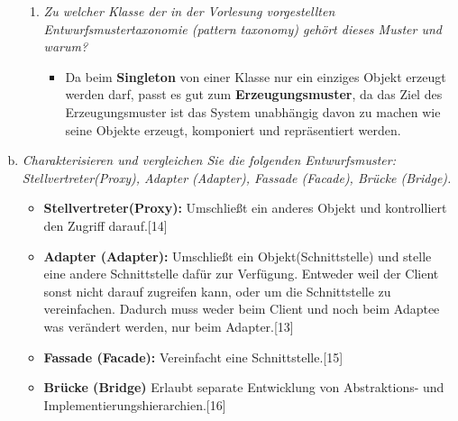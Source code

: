 \begin{enumerate}[(a)]
\begin{enumerate}[1.]
        
        \item {\itshape Zu welcher Klasse der in der Vorlesung vorgestellten Entwurfsmustertaxonomie (pattern taxonomy) gehört dieses Muster und warum?}
        \begin{itemize} 
            \item  Da beim \textbf{Singleton} von einer Klasse nur ein einziges Objekt erzeugt werden darf, passt es gut zum \textbf{Erzeugungsmuster}, da das Ziel des Erzeugungsmuster ist das System unabhängig davon zu machen wie seine Objekte erzeugt, komponiert und repräsentiert werden.
        \end{itemize}

    \end{enumerate}
    
    \item {\itshape Charakterisieren und vergleichen Sie die folgenden Entwurfsmuster: Stellvertreter(Proxy), Adapter (Adapter), Fassade (Facade), Brücke (Bridge).}
    \begin{itemize}
        \item \textbf{Stellvertreter(Proxy):} Umschließt ein anderes Objekt und kontrolliert den Zugriff darauf.[14]
        \item \textbf{Adapter (Adapter):} Umschließt ein Objekt(Schnittstelle) und stelle eine andere Schnittstelle dafür zur Verfügung. Entweder weil der Client sonst nicht darauf zugreifen kann, oder um die Schnittstelle zu vereinfachen. Dadurch muss weder beim Client und noch beim Adaptee was verändert werden, nur beim Adapter.[13]
        \item \textbf{Fassade (Facade):} Vereinfacht eine Schnittstelle.[15]
        \item \textbf{Brücke (Bridge)} Erlaubt separate Entwicklung von Abstraktions- und Implementierungshierarchien.[16]

    \end{itemize}
    
\end{enumerate}



